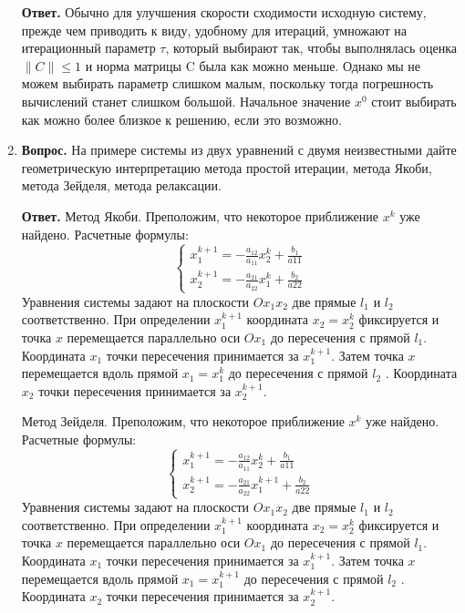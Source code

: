 \documentclass[12pt, a4paper]{article}
\begin{document}
\begin{enumerate}
	  \textbf{Ответ.}	Обычно для улучшения скорости сходимости исходную систему,
	 	прежде чем приводить к виду, удобному для итераций, умножают
	 	на итерационный параметр $\tau$, который выбирают так, чтобы
	 	выполнялась оценка $\|C\| \leq 1$ и норма матрицы C была как можно
	 	меньше. Однако мы не можем выбирать параметр слишком малым, поскольку тогда погрешность вычислений станет слишком большой. Начальное значение $x^0$ стоит выбирать как можно более близкое к решению, если это возможно.
	 	
		\item  \textbf{Вопрос.} На примере системы из двух уравнений с двумя неизвестными дайте геометрическую интерпретацию метода простой итерации, метода Якоби, метода Зейделя, метода релаксации.
		
	 \textbf{Ответ.} 	Метод Якоби. Преположим, что некоторое приближение $x^k$ уже найдено.
	    Расчетные формулы: 
	   \[
	   \begin{cases}
	    	x_1^{k+1} = -\frac{a_{12}}{a_{11}}x_2^k + \frac{b_1}{a{11}} \\
    		x_2^{k+1} = -\frac{a_{21}}{a_{22}}x_1^k + \frac{b_2}{a{22}}
	    \end{cases} 
     \]
     Уравнения системы задают на плоскости $Ox_1x_2$ две прямые $l_1$ и $l_2$ соответственно. При определении $x_1^{k+1}$ координата $x_2 = x_2^k$ фиксируется и точка $x$ перемещается параллельно оси $Ox_1$ до пересечения с прямой $l_1$. Координата $x_1$ точки пересечения
     принимается за $x_1^{k+1}$. Затем точка  $x$  перемещается вдоль прямой  $x_1 = x_1^k$ до пересечения с прямой  $l_2$ . Координата $x_2$ точки пересечения принимается за  $x_2^{k+1}$.
     
     Метод Зейделя. Преположим, что некоторое приближение $x^k$ уже найдено.
     Расчетные формулы: 
     \[
     \begin{cases}
     	x_1^{k+1} = -\frac{a_{12}}{a_{11}}x_2^k + \frac{b_1}{a{11}} \\
     	x_2^{k+1} = -\frac{a_{21}}{a_{22}}x_1^{k+1} + \frac{b_2}{a{22}}
     \end{cases} 
     \]
	 Уравнения системы задают на плоскости $Ox_1x_2$ две прямые $l_1$ и $l_2$ соответственно. При определении $x_1^{k+1}$ координата $x_2 = x_2^k$ фиксируется и точка $x$ перемещается параллельно оси $Ox_1$ до пересечения с прямой $l_1$. Координата $x_1$ точки пересечения
	принимается за $x_1^{k+1}$. Затем точка  $x$  перемещается вдоль прямой  $x_1 = x_1^{k+1}$ до пересечения с прямой  $l_2$ . Координата $x_2$ точки пересечения принимается за  $x_2^{k+1}$.
	

\end{enumerate}
\end{document}
